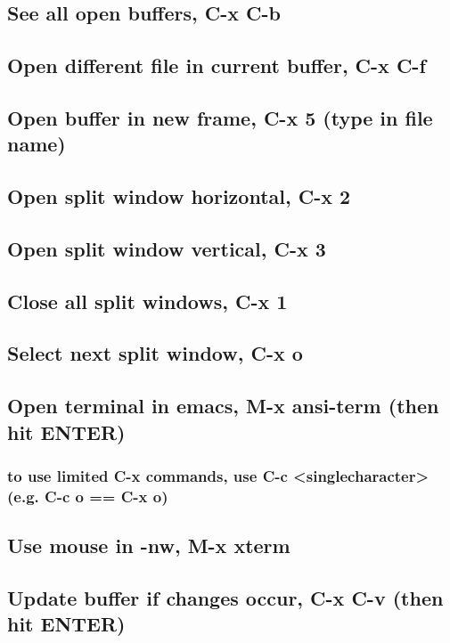 \documentclass[11pt]{article}
\begin{document}
\subsection{See all open buffers, C-x C-b}
\label{sec:orgd6486cd}
\subsection{Open different file in current buffer, C-x C-f}
\label{sec:org16097bc}
\subsection{Open buffer in new frame, C-x 5 (type in file name)}
\label{sec:org6bc982c}
\subsection{Open split window horizontal, C-x 2}
\label{sec:org6f3cb8d}
\subsection{Open split window vertical, C-x 3}
\label{sec:orgf78279b}
\subsection{Close all split windows, C-x 1}
\label{sec:org581fe88}
\subsection{Select next split window, C-x o}
\label{sec:orgb94a60c}
\subsection{Open terminal in emacs, M-x ansi-term (then hit ENTER)}
\label{sec:orgeb7df18}
\subsubsection{to use limited C-x commands, use C-c <singlecharacter> (e.g. C-c o == C-x o)}
\label{sec:org2a665de}
\subsection{Use mouse in -nw, M-x xterm}
\label{sec:org1da042c}
\subsection{Update buffer if changes occur, C-x C-v (then hit ENTER)}
\label{sec:org9227c2f}
\end{document}
